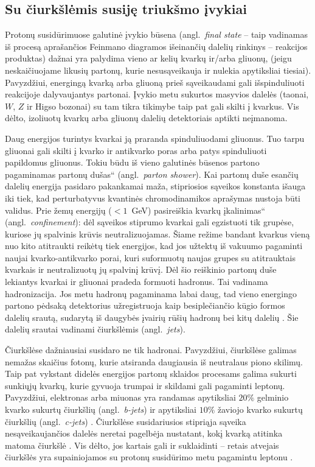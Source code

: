 \documentclass[a4paper, 12pt, oneside]{article}
\newcommand{\ltq}[1]{{\quotedblbase{}#1\textquotedblleft{}}}
\newlength\q
\begin{document}
\subsection{Su čiurkšlėmis susiję triukšmo įvykiai}\label{sec:jets}
Protonų susidūrimuose galutinė įvykio būsena (angl.\ \textit{final state} -- taip vadinamas iš procesą aprašančios
Feinmano diagramos išeinančių dalelių rinkinys -- reakcijos produktas) dažnai yra palydima vieno ar kelių kvarkų ir/arba gliuonų,
(jeigu neskaičiuojame likusių partonų, kurie nesusąveikauja ir nulekia apytiksliai tiesiai).
Pavyzdžiui, energingą kvarką arba gliuoną prieš sąveikaudami gali išspinduliuoti reakcijoje dalyvaujantys partonai.
Įvykio metu sukurtos masyvios dalelės (taonai, $W$, $Z$ ir Higso bozonai) su tam tikra tikimybe taip pat gali skilti į kvarkus.
Vis dėlto, izoliuotų kvarkų arba gliuonų dalelių detektoriais aptikti neįmanoma.

Daug energijos turintys kvarkai ją praranda spinduliuodami gliuonus.
Tuo tarpu gliuonai gali skilti į kvarko ir antikvarko poras arba patys spinduliuoti papildomus gliuonus.
Tokiu būdu iš vieno galutinės būsenos partono pagaminamas \ltq{partonų dušas} (angl.\ \textit{parton shower}).
Kai partonų duše esančių dalelių energija pasidaro pakankamai maža, stipriosios sąveikos konstanta išauga iki
tiek, kad perturbatyvus kvantinės chromodinamikos aprašymas nustoja būti validus.
Prie žemų energijų ($<\!1$~GeV) pasireiškia kvarkų \ltq{įkalinimas} (angl.\ \textit{confinement}): dėl sąveikos stiprumo
kvarkai gali egzistuoti tik grupėse, kuriose jų spalvinis krūvis neutralizuojamas.
Šiame režime bandant kvarkus vieną nuo kito atitraukti reikėtų tiek energijos, kad jos užtektų iš vakuumo pagaminti
naujai kvarko-antikvarko porai, kuri suformuotų naujas grupes su atitrauktais kvarkais ir neutralizuotų jų spalvinį krūvį.
Dėl šio reiškinio partonų duše lekiantys kvarkai ir gliuonai pradeda formuoti hadronus.
Tai vadinama hadronizacija.
Jos metu hadronų pagaminama labai daug, tad vieno energingo partono pėdsaką detektorius užregistruoja kaip besiplečiančio
kūgio formos dalelių srautą, sudarytą iš daugybės įvairių rūšių hadronų bei kitų dalelių \cite{Jets}.
Šie dalelių srautai vadinami čiurkšlėmis (angl.\ \textit{jets}).

Čiurkšlėse dažniausiai susidaro ne tik hadronai.
Pavyzdžiui, čiurkšlėse galimas nemažas skaičius fotonų, kurie atsiranda daugiausia iš neutralaus piono skilimų.
Taip pat vykstant didelės energijos partonų sklaidos procesams galima sukurti sunkiųjų kvarkų, kurie gyvuoja trumpai
ir skildami gali pagaminti leptonų.
Pavyzdžiui, elektronas arba miuonas yra randamas apytiksliai $20\%$ gelminio kvarko sukurtų čiurkšlių
(angl.\ \textit{b-jets}) ir apytiksliai $10\%$ žaviojo kvarko sukurtų čiurkšlių (angl.\ \textit{c-jets}) \cite{LeptonJets}.
Čiurkšlėse susidariusios stipriąja sąveika nesąveikaujančios dalelės neretai pagelbėja nustatant,
kokį kvarką atitinka matoma čiurkšlė \cite{LeptonJets}.
Vis dėlto, jos kartais gali ir suklaidinti -- retais atvejais čiurkšlės yra supainiojamos su protonų susidūrimo metu
pagamintu leptonu
\cite{DY_CMS2011, DY_CMS2013, DY_ATLAS2013, DY_ATLAS2014, DY_CMS2015, DY_ATLAS2016, DY_ATLAS2017, DY_CMS2019, EleID, MuonID}.
\end{document}
